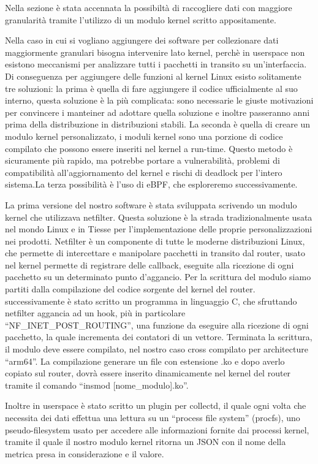 Nella sezione \cite{chapter:our_work} è stata accennata la possibiltà di raccogliere dati con maggiore granularità tramite l'utilizzo di un modulo kernel scritto appositamente.

Nella caso in cui si vogliano aggiungere dei software per collezionare dati maggiormente granulari bisogna intervenire lato kernel, perchè in userspace non esistono meccanismi per analizzare tutti i pacchetti in transito su un'interfaccia. Di conseguenza per aggiungere delle funzioni al kernel Linux esisto solitamente tre soluzioni: la prima è quella di fare aggiungere il codice ufficialmente al suo interno, questa soluzione è la più complicata: sono necessarie le giuste motivazioni per convincere i manteiner ad adottare quella soluzione e inoltre passeranno anni prima della distribuzione in distribuzioni stabili. La seconda è quella di creare un modulo kernel personalizzato, i moduli kernel sono una porzione di codice compilato che possono essere inseriti nel kernel a run-time. Questo metodo è sicuramente più rapido, ma potrebbe portare a vulnerabilità, problemi di compatibilità all'aggiornamento del kernel e rischi di deadlock per l'intero sistema.La terza possibilità è l'uso di eBPF, che esploreremo successivamente.

La prima versione del nostro software è stata sviluppata scrivendo un modulo kernel che utilizzava netfilter. Questa soluzione è la strada tradizionalmente usata nel mondo Linux e in Tiesse per l'implementazione delle proprie personalizzazioni nei prodotti.
Netfilter è un componente di tutte le moderne distribuzioni Linux, che permette di intercettare e manipolare pacchetti in transito dal router, usato nel kernel permette di registrare delle callback, eseguite alla ricezione di ogni pacchetto su un determinato punto d'aggancio.
Per la scrittura del modulo siamo partiti dalla compilazione del codice sorgente del kernel del router. successivamente è stato scritto un programma in linguaggio C, che sfruttando netfilter aggancia ad un hook, più in particolare ``NF\_INET\_POST\_ROUTING'', una funzione da eseguire alla ricezione di ogni pacchetto, la quale incrementa dei contatori di un vettore.
Terminata la scrittura, il modulo deve essere compilato, nel nostro caso cross compilato per architecture ``arm64''. La compilazione generare un file con estensione .ko e dopo averlo copiato sul router, dovrà essere inserito dinamicamente nel kernel del router tramite il comando ``insmod [nome\_modulo].ko''.

Inoltre in userspace è stato scritto un plugin per collectd, il quale ogni volta che necessita dei dati effettua una lettura su un ``process file system'' (procfs), uno pseudo-filesystem usato per accedere alle informazioni fornite dai processi kernel, tramite il quale il nostro modulo kernel ritorna un JSON con il nome della metrica presa in considerazione e il valore.

